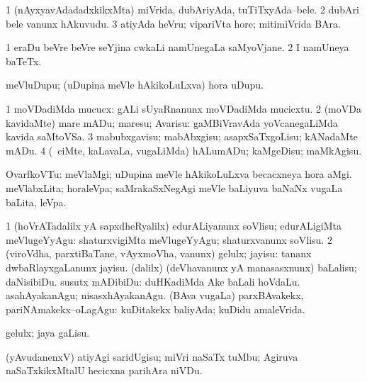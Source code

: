 \bentry
{}
\gl{\nA}
\bmng
\bnum
\num{1} (nAyxyavAdadadxkikxMta) miVrida, dubAriyAda, tuTiTxyAda--bele. 
\num{2} dubAri bele \mo vanunx hAkuvudu. 
\num{3} atiyAda heVru; vipariVta hore; mitimiVrida BAra. 
\enum
\emng
\eentry

\bentry
{}
\gl{\nA}
\bmng
\bnum
\num{1} eraDu beVre beVre seYjina cwkaLi namUnegaLa saMyoVjane. 
\num{2} I namUneya baTeTx. 
\enum
\emng
\eentry

\bentry
{}
\gl{\nA}
\bmng
meVluDupu; (uDupina meVle hAkikoLuLxva) hora uDupu. 
\emng
\eentry

\bentry
{}
\gl{\sakirx}
\bmng
\bnum
\num{1} moVDadiMda mucucx:  gALi sUyaRnanunx moVDadiMda mucicxtu. 
\num{2} (moVDa kavidaMte) mare mADu; maresu; Avarisu:  gaMBiVravAda yoVcanegaLiMda kavida saMtoVSa. 
\num{3} mabubxgavisu; mabAbxgisu; asapxSaTxgoLisu; kANadaMte mADu. 
\num{4} (\kanmu\ ciMte, kaLavaLa, \mo vugaLiMda) hALumADu; kaMgeDisu; maMkAgisu. 
\enum
\emng
\eentry

\bentry
{}
\gl{\nA}
\bmng
OvarfkoVTu: 
\banum
{} meVlaMgi; uDupina meVle hAkikoLuLxva becacxneya hora aMgi. 
 meVlabxLita; horaleVpa; saMrakaSxNegAgi meVle baLiyuva baNaNx \mo vugaLa baLita, leVpa. 
\eanum
\emng
\eentry

\bentry
{}
\gl{\sakirx}
\bmng
\bnum
\num{1} (hoVrATadalilx yA sapxdheRyalilx) edurALiyanunx soVlisu; edurALigiMta meVlugeYyAgu:  shaturxvigiMta meVlugeYyAgu; shaturxvanunx soVlisu. 
\num{2} (viroVdha, parxtiBaTane, vAyxmoVha, \mo vanunx) gelulx; jayisu:  tananx dwbaRlayxgaLanunx jayisu. 
 (\BUkaq dalilx) 
\banum
{} (deVhavanunx yA manasasxnunx) baLalisu; daNisibiDu. susutx mADibiDu:  duHKadiMda Ake baLali hoVdaLu. 
 asahAyakanAgu; nisasxhAyakanAgu. 
 (BAva \mo vugaLa) parxBAvakekx, pariNAmakekx--oLagAgu:  kuDitakekx baliyAda; kuDidu amaleVrida. 
\eanum
\numie
\enum
\emng

\noindent
\gl{\akirx}
\bmng
gelulx; jaya gaLisu. 
\emng
\eentry

\bentry
{}
\gl{\sakirx}
\bmng
(yAvudanenxV) atiyAgi saridUgisu; miVri naSaTx tuMbu; Agiruva naSaTxkikxMtalU hecicxna parihAra niVDu. 
\emng

